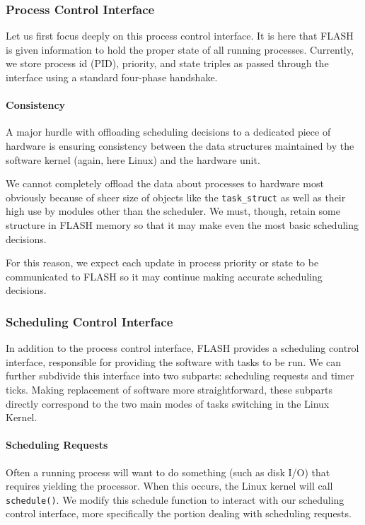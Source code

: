 \documentclass{sig-alternate-10pt}
\newcommand{\ttt}{\texttt}
\begin{document}
\subsubsection{Process Control Interface}
Let us first focus deeply on this process control interface.  It is here
that FLASH is given information to hold the proper state of all running
processes.  Currently, we store process id (PID), priority, and state
triples as passed through the interface using a standard four-phase
handshake.

\paragraph{Consistency} A major hurdle with offloading scheduling decisions
to a dedicated piece of hardware is ensuring consistency between the data
structures maintained by the software kernel (again, here Linux) and the
hardware unit.

We cannot completely offload the data about processes to hardware most
obviously because of sheer size of objects like the \ttt{task\_struct} as
well as their high use by modules other than the scheduler.  We must,
though, retain some structure in FLASH memory so that it may make even the
most basic scheduling decisions.

For this reason, we expect each update in process priority or state to be
communicated to FLASH so it may continue making accurate scheduling
decisions.

\subsubsection{Scheduling Control Interface}
In addition to the process control interface, FLASH provides a scheduling
control interface, responsible for providing the software with tasks to be
run.  We can further subdivide this interface into two subparts: scheduling
requests and timer ticks.  Making replacement of software more
straightforward, these subparts directly correspond to the two main modes of
tasks switching in the Linux Kernel.

\paragraph{Scheduling Requests}
Often a running process will want to do something (such as disk I/O) that
requires yielding the processor.  When this occurs, the Linux kernel will
call \texttt{schedule()}.  We modify this schedule function to interact with
our scheduling control interface, more specifically the portion dealing with
scheduling requests.
\end{document}
